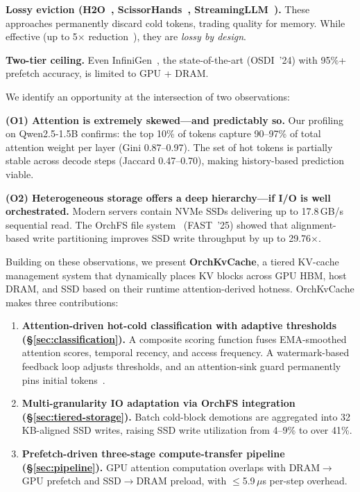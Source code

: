 \documentclass[conference]{IEEEtran}
\begin{document}
\textbf{Lossy eviction (H2O~\cite{h2o}, ScissorHands~\cite{scissorhands}, StreamingLLM~\cite{streamingllm}).} These approaches permanently discard cold tokens, trading quality for memory. While effective (up to 5$\times$ reduction~\cite{h2o}), they are \emph{lossy by design}.

\textbf{Two-tier ceiling.} Even InfiniGen~\cite{infinigen}, the state-of-the-art (OSDI~'24) with 95\%+ prefetch accuracy, is limited to GPU + DRAM.

We identify an opportunity at the intersection of two observations:

\textbf{(O1) Attention is extremely skewed---and predictably so.} Our profiling on Qwen2.5-1.5B confirms: the top 10\% of tokens capture 90--97\% of total attention weight per layer (Gini 0.87--0.97). The set of hot tokens is partially stable across decode steps (Jaccard 0.47--0.70), making history-based prediction viable.

\textbf{(O2) Heterogeneous storage offers a deep hierarchy---if I/O is well orchestrated.} Modern servers contain NVMe SSDs delivering up to 17.8\,GB/s sequential read. The OrchFS file system~\cite{orchfs} (FAST~'25) showed that alignment-based write partitioning improves SSD write throughput by up to 29.76$\times$.

Building on these observations, we present \textbf{OrchKvCache}, a tiered KV-cache management system that dynamically places KV blocks across GPU HBM, host DRAM, and SSD based on their runtime attention-derived hotness. OrchKvCache makes three contributions:

\begin{enumerate}
\item \textbf{Attention-driven hot-cold classification with adaptive thresholds (\S\ref{sec:classification}).} A composite scoring function fuses EMA-smoothed attention scores, temporal recency, and access frequency. A watermark-based feedback loop adjusts thresholds, and an attention-sink guard permanently pins initial tokens~\cite{streamingllm}.

\item \textbf{Multi-granularity IO adaptation via OrchFS integration (\S\ref{sec:tiered-storage}).} Batch cold-block demotions are aggregated into 32\,KB-aligned SSD writes, raising SSD write utilization from 4--9\% to over 41\%.

\item \textbf{Prefetch-driven three-stage compute-transfer pipeline (\S\ref{sec:pipeline}).} GPU attention computation overlaps with DRAM$\to$GPU prefetch and SSD$\to$DRAM preload, with $\leq$5.9\,$\mu$s per-step overhead.
\end{enumerate}
\end{document}
